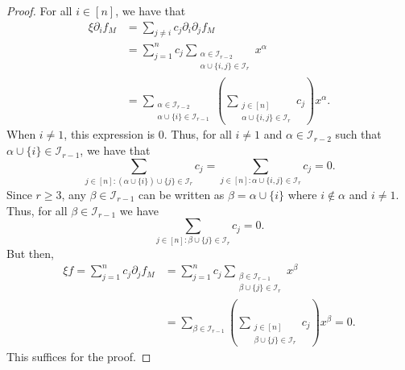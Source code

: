 \documentclass[12pt]{article}
\begin{document}
\begin{proof}
	For all $i \in [n]$, we have that
	\begin{align*}
		\xi \partial_i f_M & = \sum_{j \neq i} c_j \partial_i \partial_j f_M \\
		& = \sum_{j = 1}^n c_j \sum_{\substack{\alpha \in \mathcal{I}_{r-2} \\ \alpha \cup \{i,j\} \in \mathcal{I}_r}} x^\alpha \\
		& = \sum_{\substack{\alpha \in \mathcal{I}_{r-2} \\ \alpha \cup \{i\} \in \mathcal{I}_{r-1}}}\left ( \sum_{\substack{j \in [n] \\ \alpha \cup \{i, j\} \in \mathcal{I}_r}} c_j \right ) x^\alpha.
	\end{align*}
	When $i \neq 1$, this expression is $0$. Thus, for all $i \neq 1$ and $\alpha \in \mathcal{I}_{r-2}$ such that $\alpha \cup \{i\} \in \mathcal{I}_{r-1}$, we have that 
	\[
		\sum_{j \in [n] : (\alpha \cup \{i\}) \cup \{j\} \in \mathcal{I}_r} c_j = \sum_{j \in [n] : \alpha \cup \{i, j\} \in \mathcal{I}_r} c_j = 0.
	\]
	Since $r \geq 3$, any $\beta \in \mathcal{I}_{r-1}$ can be written as $\beta = \alpha \cup \{i\}$ where $i \notin \alpha$ and $i \neq 1$. Thus, for all $\beta \in \mathcal{I}_{r-1}$ we have
	\[
		\sum_{j \in [n] : \beta \cup \{j\} \in \mathcal{I}_r} c_j = 0.
	\]
	But then,
	\begin{align*}
		\xi f = \sum_{j = 1}^n c_j \partial_j f_M & = \sum_{j = 1}^n c_j \sum_{\substack{\beta \in \mathcal{I}_{r-1} \\ \beta \cup \{j\} \in \mathcal{I}_r}} x^\beta \\
		& = \sum_{\beta \in \mathcal{I}_{r-1}} \left ( \sum_{\substack{j \in [n] \\ \beta \cup \{j\} \in \mathcal{I}_r}} c_j \right ) x^\beta = 0.
	\end{align*}
	This suffices for the proof. 

\end{proof}


\end{document}
